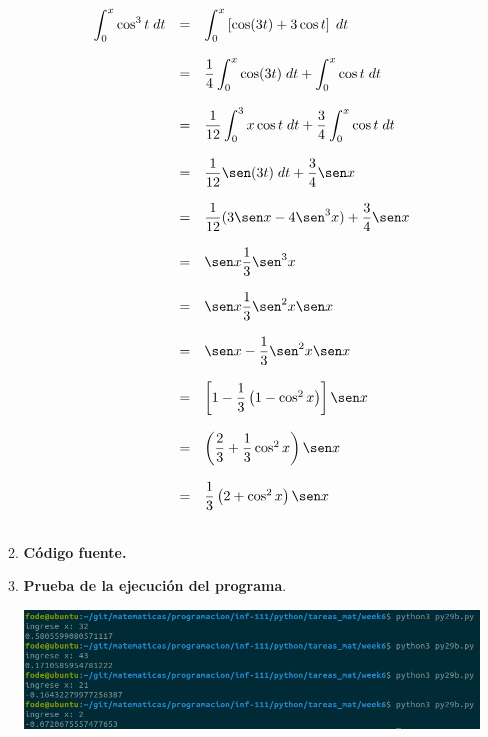 \begin{enumerate}
\begin{enumerate}[\bfseries a)]
	    $$\begin{array}{rcl}
		\displaystyle\int_0^x \cos^3 t\; dt&=&\displaystyle\int_0^x \left[\cos(3t) + 3\cos t\right]\; dt\\\\
						   &=&\dfrac{1}{4}\displaystyle\int_0^x \cos(3t)\; dt + \displaystyle\int_0^x \cos t \; dt\\\\
						   &=&\dfrac{1}{12}\displaystyle\int_0^3x \cos t \; dt + \dfrac{3}{4}\displaystyle\int_0^x \cos t \; dt\\\\
						   &=&\dfrac{1}{12} \sen(3t) \; dt + \dfrac{3}{4}\sen x\\\\
						   &=&\dfrac{1}{12}(3\sen x - 4 \sen^3 x) + \dfrac{3}{4}\sen x\\\\
						   &=&\sen x \dfrac{1}{3}\sen^3 x\\\\
						   &=&\sen x \dfrac{1}{3}\sen^2x \sen x\\\\
						   &=&\sen x - \dfrac{1}{3}\sen^2x \sen x\\\\
						   &=&\left[1 - \dfrac{1}{3}\left(1-\cos^2 x\right)\right]\sen x\\\\
						   &=&\left(\dfrac{2}{3}+\dfrac{1}{3}\cos^2 x\right)\sen x\\\\
						   &=&\dfrac{1}{3}\left(2+\cos^2 x\right)\sen x\\\\
		\end{array}$$

	\item \textbf{Código fuente.}\\ 
	    
	    
	    \vspace{1cm}
	
	\item \textbf{Prueba de la ejecución del programa}.\\
	    \begin{center}
		\includegraphics[scale=.55]{imagenes/tareas_mat/week6/py29b.png}
	    \end{center}

    \end{enumerate}

\newpage

\end{enumerate}
